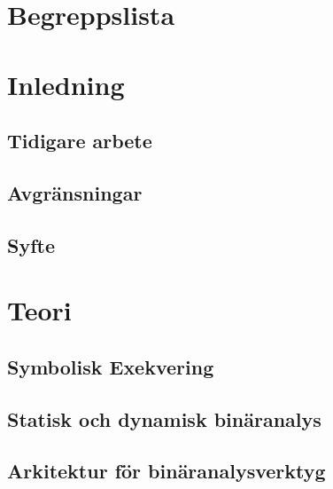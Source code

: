 \documentclass[12pt, a4paper]{report}
\begin{document}

\newpage



\newpage

\tableofcontents
\newpage

\chapter*{Begreppslista}


\newpage

\chapter{Inledning}

\section{Tidigare arbete}

\section{Avgränsningar}

\section{Syfte}


\chapter{Teori}

\section{Symbolisk Exekvering}

\section{Statisk och dynamisk binäranalys}

\section{Arkitektur för binäranalysverktyg}

\end{document}
